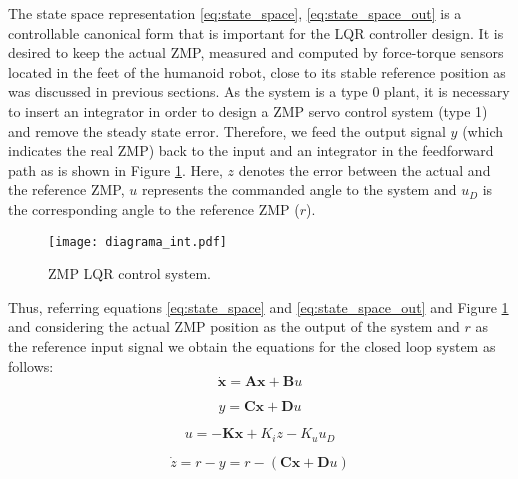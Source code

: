 The state space representation \ref{eq:state_space}, \ref{eq:state_space_out} is a controllable canonical form that is important for the LQR controller design. It is desired to keep the actual ZMP, measured and computed by force-torque sensors located in the feet of the humanoid robot, close to its stable reference position as was discussed in previous sections. As the system is a type 0 plant, it is necessary to insert an integrator in order to design a ZMP servo control system (type 1) and remove the steady state error. Therefore, we feed the output signal $y$ (which indicates the real ZMP) back to the input and an integrator in the feedforward path as is shown in Figure \ref{fig:diagrama_int}. Here, $z$ denotes the error between the actual and the reference ZMP, $u$ represents the commanded angle to the system and $u_D$ is the corresponding angle to the reference ZMP ($r$).

\begin{figure}[!hbt]
\centering
\texttt{[image: diagrama\_int.pdf]}
\caption{ZMP LQR control system.}
\label{fig:diagrama_int}
\end{figure}

Thus, referring equations \ref{eq:state_space} and \ref{eq:state_space_out} and Figure \ref{fig:diagrama_int} and considering the actual ZMP position as the output of the system and $r$ as the reference input signal we obtain the equations for the closed loop system as follows:
\begin{equation}
\mathbf{\dot{x}} = \mathbf{A}\textbf{x} + \mathbf{B}u
\end{equation}

\begin{equation}
y = \textbf{C}\textbf{x} + \textbf{D}u
\end{equation}

\begin{equation}
u = - \textbf{K}\textbf{x} + K_i z - K_u u_D
\end{equation}

\begin{equation}
\dot{z} = r - y = r - (\textbf{C}\textbf{x} + \textbf{D}u)
\end{equation}

